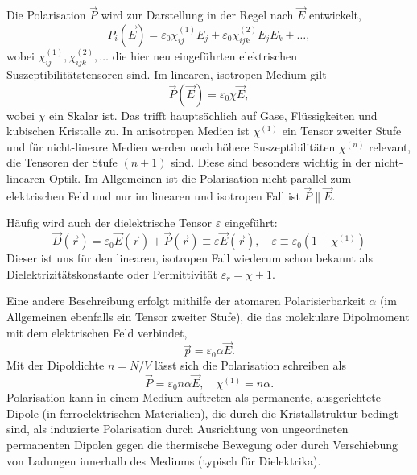 Die Polarisation $\vec {P}$ wird zur Darstellung in der Regel nach $\vec {E}$ entwickelt,
\begin{equation*}
	P_{i}\left(\vec {E}\right)=\varepsilon _{0}\chi _{ij}^{\left(1\right)}E_{j}+\varepsilon _{0}\chi _{ijk}^{\left(2\right)}E_{j}E_{k}+\ldots ,
\end{equation*}
wobei $\chi _{ij}^{\left(1\right)}, \chi _{ijk}^{\left(2\right)},\ldots $ die hier neu eingeführten elektrischen Suszeptibilitätstensoren sind. Im linearen, isotropen Medium gilt
\begin{equation*}
	\vec {P}\left(\vec {E}\right)=\varepsilon _{0}\chi \vec {E},
\end{equation*}
wobei $\chi $ ein Skalar ist. Das trifft hauptsächlich auf Gase, Flüssigkeiten und kubischen Kristalle zu. In anisotropen Medien ist $\chi ^{\left(1\right)}$ ein Tensor zweiter Stufe und für nicht-lineare Medien werden noch höhere Suszeptibilitäten $\chi ^{\left(n\right)}$ relevant, die Tensoren der Stufe $\left(n+1\right)$ sind. Diese sind besonders wichtig in der nicht-linearen Optik. Im Allgemeinen ist die Polarisation nicht parallel zum elektrischen Feld und nur im linearen und isotropen Fall ist $\vec {P}\parallel \vec {E}$.

Häufig wird auch der dielektrische Tensor $\varepsilon $ eingeführt:
\begin{equation*}
	\vec {D}\left(\vec {r}\right)=\varepsilon _{0}\vec {E}\left(\vec {r}\right)+\vec {P}\left(\vec {r}\right)\equiv \varepsilon \vec {E}\left(\vec {r}\right), \quad\varepsilon \equiv \varepsilon _{0}\left(1+\chi ^{\left(1\right)}\right)
\end{equation*}
Dieser ist uns für den linearen, isotropen Fall wiederum schon bekannt als Dielektrizitätskonstante oder Permittivität $\varepsilon _{r}=\chi +1$.

Eine andere Beschreibung erfolgt mithilfe der atomaren Polarisierbarkeit $\alpha $ (im Allgemeinen ebenfalls ein Tensor zweiter Stufe), die das molekulare Dipolmoment mit dem elektrischen Feld verbindet,
\begin{equation*}
	\vec {p}=\varepsilon _{0}\alpha \vec {E}.
\end{equation*}
Mit der Dipoldichte $n=N/V$ lässt sich die Polarisation schreiben als
\begin{equation*}
	\vec {P}=\varepsilon _{0}n\alpha \vec {E}, \quad\chi ^{\left(1\right)}=n\alpha .
\end{equation*}
Polarisation kann in einem Medium auftreten als permanente, ausgerichtete Dipole (in ferroelektrischen Materialien), die durch die Kristallstruktur bedingt sind, als induzierte Polarisation durch Ausrichtung von ungeordneten permanenten Dipolen gegen die thermische Bewegung oder durch Verschiebung von Ladungen innerhalb des Mediums (typisch für Dielektrika).

